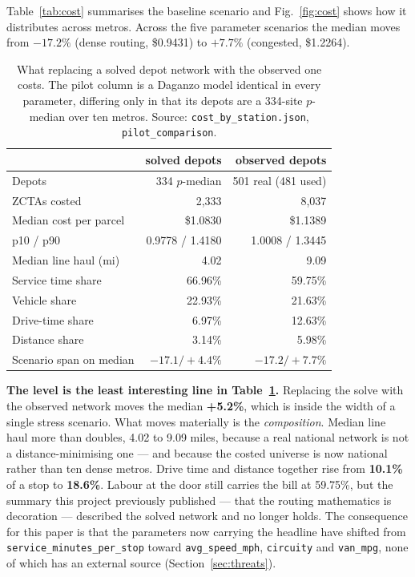 \documentclass[conference]{IEEEtran}
\begin{document}
Table~\ref{tab:cost} summarises the baseline scenario and Fig.~\ref{fig:cost}
shows how it distributes across metros. Across the five parameter scenarios
the median moves from $-17.2\%$ (dense routing, \$0.9431) to $+7.7\%$
(congested, \$1.2264).

\begin{table}[!t]
\caption{What replacing a solved depot network with the observed one costs.
The pilot column is a Daganzo model identical in every parameter, differing
only in that its depots are a 334-site $p$-median over ten metros. Source:
\texttt{cost\_by\_station.json}, \texttt{pilot\_comparison}.}
\label{tab:depotswap}
\centering
\begin{tabular}{lrr}
\hline
& solved depots & observed depots \\
\hline
Depots & 334 $p$-median & 501 real (481 used) \\
ZCTAs costed & 2{,}333 & 8{,}037 \\
Median cost per parcel & \$1.0830 & \$1.1389 \\
p10 / p90 & 0.9778 / 1.4180 & 1.0008 / 1.3445 \\
Median line haul (mi) & 4.02 & 9.09 \\
Service time share & 66.96\% & 59.75\% \\
Vehicle share & 22.93\% & 21.63\% \\
Drive-time share & 6.97\% & 12.63\% \\
Distance share & 3.14\% & 5.98\% \\
Scenario span on median & $-17.1/+4.4\%$ & $-17.2/+7.7\%$ \\
\hline
\end{tabular}
\end{table}

\textbf{The level is the least interesting line in Table~\ref{tab:depotswap}.}
Replacing the solve with the observed network moves the median \textbf{+5.2\%},
which is inside the width of a single stress scenario. What moves materially is
the \emph{composition}. Median line haul more than doubles, 4.02 to 9.09 miles,
because a real national network is not a distance-minimising one --- and
because the costed universe is now national rather than ten dense metros. Drive
time and distance together rise from \textbf{10.1\%} of a stop to
\textbf{18.6\%}. Labour at the door still carries the bill at 59.75\%, but the
summary this project previously published --- that the routing mathematics is
decoration --- described the solved network and no longer holds. The
consequence for this paper is that the parameters now carrying the headline
have shifted from \texttt{service\_minutes\_per\_stop} toward
\texttt{avg\_speed\_mph}, \texttt{circuity} and \texttt{van\_mpg}, none of
which has an external source (Section~\ref{sec:threats}).
\end{document}
